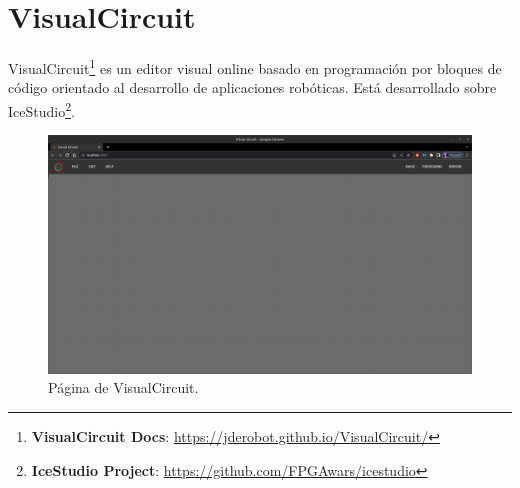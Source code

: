 \section{VisualCircuit}
\label{sec:visualcircuit}

VisualCircuit\footnote{\textbf{VisualCircuit Docs}: \url{https://jderobot.github.io/VisualCircuit/}} es un editor visual online basado en programación por bloques de código orientado al desarrollo de aplicaciones robóticas. Está desarrollado sobre IceStudio\footnote{\textbf{IceStudio Project}: \url{https://github.com/FPGAwars/icestudio}}.\\

\begin{figure} [H]
    \begin{center}
        \includegraphics[width=13cm]{figs/c3/empty_VC.png}
    \end{center}
    \caption[VisualCircuit]{Página de VisualCircuit.}
    \label{fig:VC_empty}
\end{figure}


